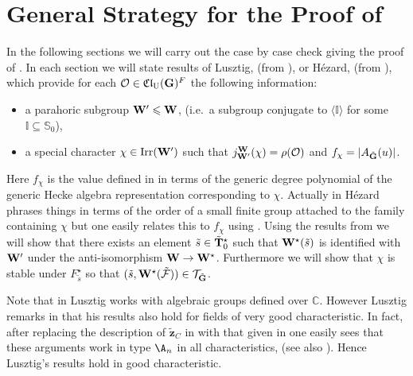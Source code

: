 \documentclass[eqthmnum]{jt-calcs}
\newcommand{\Clu}{\ensuremath{\mathfrak{Cl}_{\mathrm{U}}}}
\renewcommand{\cref}{\Cref}
\begin{document}
\section{\texorpdfstring{General Strategy for the Proof of \cref{prop:A}}{General Strategy}}\label{sec:gen-strategy}
\begin{pa}
In the following sections we will carry out the case by case check giving the proof of \cref{prop:A}. In each section we will state results of Lusztig, (from \cite{lusztig:2009:unipotent-classes-and-special-Weyl}), or H\'{e}zard, (from \cite{hezard:2004:thesis}), which provide for each $\mathcal{O} \in \Clu(\bG)^F$ the following information:
\begin{itemize}
	\item a parahoric subgroup $\mathbf{W}' \leqslant \mathbf{W}$, (i.e.\ a subgroup conjugate to $\langle \mathbb{I} \rangle$ for some $\mathbb{I} \subseteq \mathbb{S}_0$),
	\item a special character $\chi \in \operatorname{Irr}(\mathbf{W}')$ such that $j_{\mathbf{W}'}^{\mathbf{W}}(\chi) = \rho(\mathcal{O})$ and $f_{\chi} = |A_{\tilde{\mathbf{G}}}(u)|$.
\end{itemize}
Here $f_{\chi}$ is the value defined in \cite[1.1]{lusztig:2009:unipotent-classes-and-special-Weyl} in terms of the generic degree polynomial of the generic Hecke algebra representation corresponding to $\chi$. Actually in \cite{hezard:2004:thesis} H\'{e}zard phrases things in terms of the order of a small finite group attached to the family containing $\chi$ but one easily relates this to $f_{\chi}$ using \cite[4.14.2]{lusztig:1984:characters-of-reductive-groups}. Using the results from \cref{sec:quasi-isolated} we will show that there exists an element $\tilde{s} \in \tilde{\mathbf{T}}_0^{\star}$ such that $\mathbf{W}^{\star}(\tilde{s})$ is identified with $\mathbf{W}'$ under the anti-isomorphism $\mathbf{W} \to \mathbf{W}^{\star}$. Furthermore we will show that $\chi$ is stable under $F_{\tilde{s}}^{\star}$ so that $(\tilde{s},\mathbf{W}^{\star}(\tilde{\mathcal{F}})) \in \mathcal{T}_{\tilde{\mathbf{G}}}$.
\end{pa}

\begin{rem}
Note that in \cite{lusztig:2009:unipotent-classes-and-special-Weyl} Lusztig works with algebraic groups defined over $\mathbb{C}$. However Lusztig remarks in \cite[1.8]{lusztig:2009:unipotent-classes-and-special-Weyl} that his results also hold for fields of very good characteristic. In fact, after replacing the description of $\tilde{\mathbf{z}}_{C}$ in \cite[3.2]{lusztig:2009:unipotent-classes-and-special-Weyl} with that given in \cite[10.3]{lusztig:1984:intersection-cohomology-complexes} one easily sees that these arguments work in type $\A_n$ in all characteristics, (see also \cite[\S5.1]{taylor:2012:thesis}). Hence Lusztig's results hold in good characteristic.
\end{rem}
\end{document}
